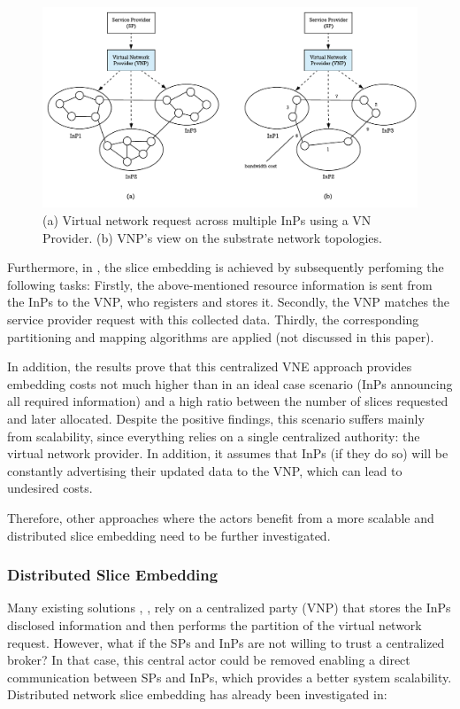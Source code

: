 \begin{figure}
	\centering
	\includegraphics[width=0.9\linewidth]{gfx/multiprov}    
  \caption{(a) Virtual network request across multiple InPs using a VN Provider. (b) VNP's view on the substrate network topologies. \citep{dietrich2015multi}}
  \label{fig:multiprov}
\end{figure}

Furthermore, in \citep{dietrich2015multi}, the slice embedding is achieved by subsequently perfoming the following tasks: Firstly, the above-mentioned resource information is sent from the InPs to the VNP, who registers and stores it. Secondly, the VNP matches the service provider request with this collected data. Thirdly, the corresponding partitioning and mapping algorithms are applied (not discussed in this paper). 

In addition, the results prove that this centralized VNE approach provides embedding costs not much higher than in an ideal case scenario (InPs announcing all required information) and a high ratio between the number of slices requested and later allocated. Despite the positive findings, this scenario suffers mainly from scalability, since everything relies on a single centralized authority: the virtual network provider. In addition, it assumes that InPs (if they do so) will be constantly advertising their updated data to the VNP, which can lead to undesired costs.

Therefore, other approaches where the actors benefit from a more scalable and distributed slice embedding need to be further investigated.

\subsubsection{Distributed Slice Embedding}

Many existing solutions \citep{houidi2011virtual}, \citep{dietrich2015multi}, \citep{dietrich2017multi} rely on a centralized party (VNP) that stores the InPs disclosed information and then performs the partition of the virtual network request. However, what if the SPs and InPs are not willing to trust a centralized broker? In that case, this central actor could be removed enabling a direct communication between SPs and InPs, which provides a better system scalability. Distributed network slice embedding has already been investigated in:

